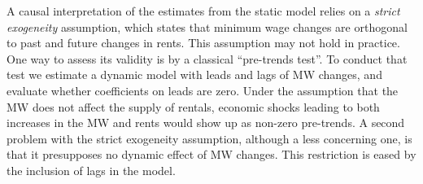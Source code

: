 A causal interpretation of the estimates from the static model relies on a \textit{strict 
exogeneity} assumption, which states that minimum wage changes are orthogonal to past and 
future changes in rents. This assumption may not hold in practice. One way to assess its 
validity is by a classical ``pre-trends test''. To conduct that test we estimate a dynamic 
model with leads and lags of MW changes, and evaluate whether coefficients on leads are zero. 
Under the assumption that the MW does not affect the supply of rentals, economic shocks leading 
to both increases in the MW and rents would show up as non-zero pre-trends. A second problem 
with the strict exogeneity assumption, although a less concerning one, is that it presupposes 
no dynamic effect of MW changes. This restriction is eased by the inclusion of lags in the model.

